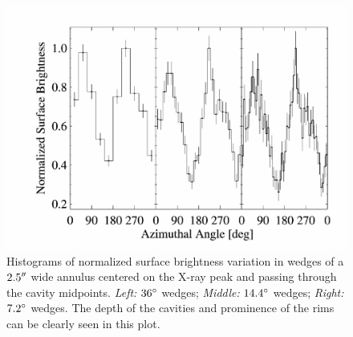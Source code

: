 \begin{figure}
  \begin{center}
    \begin{minipage}{\linewidth}
      \includegraphics*[width=\textwidth, trim=15mm 5mm 5mm 10mm, clip]{arx_pannorm.eps}
      \caption{Histograms of normalized surface brightness variation
        in wedges of a $2.5\rm{^\prime}\hskip -0.1em\rm{^\prime}$ wide annulus centered on the X-ray
        peak and passing through the cavity midpoints. {\it{Left:}}
        $36\rm{^{\circ}}$ wedges; {\it{Middle:}} $14.4\rm{^{\circ}}$ wedges;
        {\it{Right:}} $7.2\rm{^{\circ}}$ wedges. The depth of the cavities
        and prominence of the rims can be clearly seen in this plot.}
      \label{fig:pannorm}
    \end{minipage}
  \end{center}
\end{figure}

